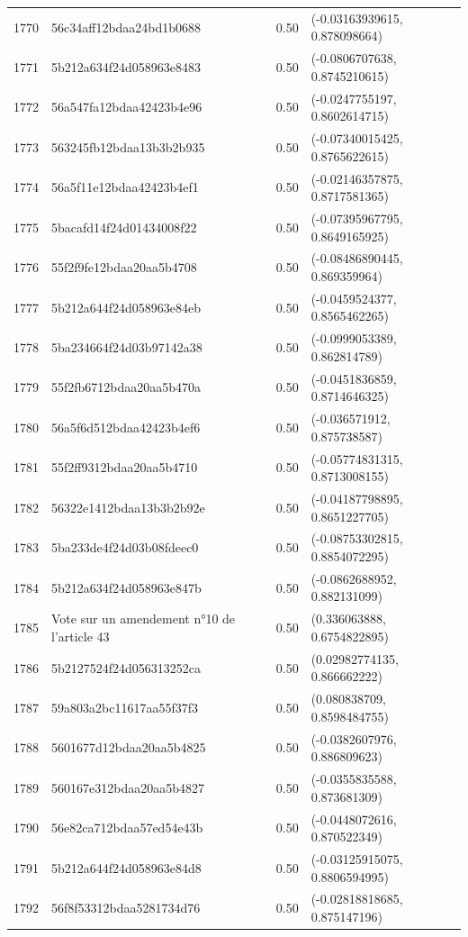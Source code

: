 \begin{table}[ht]
\begin{tabular}{rlrl}
  1770 & 56c34aff12bdaa24bd1b0688 & 0.50 & (-0.03163939615, 0.878098664) \\ 
  1771 & 5b212a634f24d058963e8483 & 0.50 & (-0.0806707638, 0.8745210615) \\ 
  1772 & 56a547fa12bdaa42423b4e96 & 0.50 & (-0.0247755197, 0.8602614715) \\ 
  1773 & 563245fb12bdaa13b3b2b935 & 0.50 & (-0.07340015425, 0.8765622615) \\ 
  1774 & 56a5f11e12bdaa42423b4ef1 & 0.50 & (-0.02146357875, 0.8717581365) \\ 
  1775 & 5bacafd14f24d01434008f22 & 0.50 & (-0.07395967795, 0.8649165925) \\ 
  1776 & 55f2f9fe12bdaa20aa5b4708 & 0.50 & (-0.08486890445, 0.869359964) \\ 
  1777 & 5b212a644f24d058963e84eb & 0.50 & (-0.0459524377, 0.8565462265) \\ 
  1778 & 5ba234664f24d03b97142a38 & 0.50 & (-0.0999053389, 0.862814789) \\ 
  1779 & 55f2fb6712bdaa20aa5b470a & 0.50 & (-0.0451836859, 0.8714646325) \\ 
  1780 & 56a5f6d512bdaa42423b4ef6 & 0.50 & (-0.036571912, 0.875738587) \\ 
  1781 & 55f2ff9312bdaa20aa5b4710 & 0.50 & (-0.05774831315, 0.8713008155) \\ 
  1782 & 56322e1412bdaa13b3b2b92e & 0.50 & (-0.04187798895, 0.8651227705) \\ 
  1783 & 5ba233de4f24d03b08fdeec0 & 0.50 & (-0.08753302815, 0.8854072295) \\ 
  1784 & 5b212a634f24d058963e847b & 0.50 & (-0.0862688952, 0.882131099) \\ 
  1785 & Vote sur un amendement n°10 de l'article 43 & 0.50 & (0.336063888, 0.6754822895) \\ 
  1786 & 5b2127524f24d056313252ca & 0.50 & (0.02982774135, 0.866662222) \\ 
  1787 & 59a803a2bc11617aa55f37f3 & 0.50 & (0.080838709, 0.8598484755) \\ 
  1788 & 5601677d12bdaa20aa5b4825 & 0.50 & (-0.0382607976, 0.886809623) \\ 
  1789 & 560167e312bdaa20aa5b4827 & 0.50 & (-0.0355835588, 0.873681309) \\ 
  1790 & 56e82ca712bdaa57ed54e43b & 0.50 & (-0.0448072616, 0.870522349) \\ 
  1791 & 5b212a644f24d058963e84d8 & 0.50 & (-0.03125915075, 0.8806594995) \\ 
  1792 & 56f8f53312bdaa5281734d76 & 0.50 & (-0.02818818685, 0.875147196) \\ 

\end{tabular}
\end{table}
